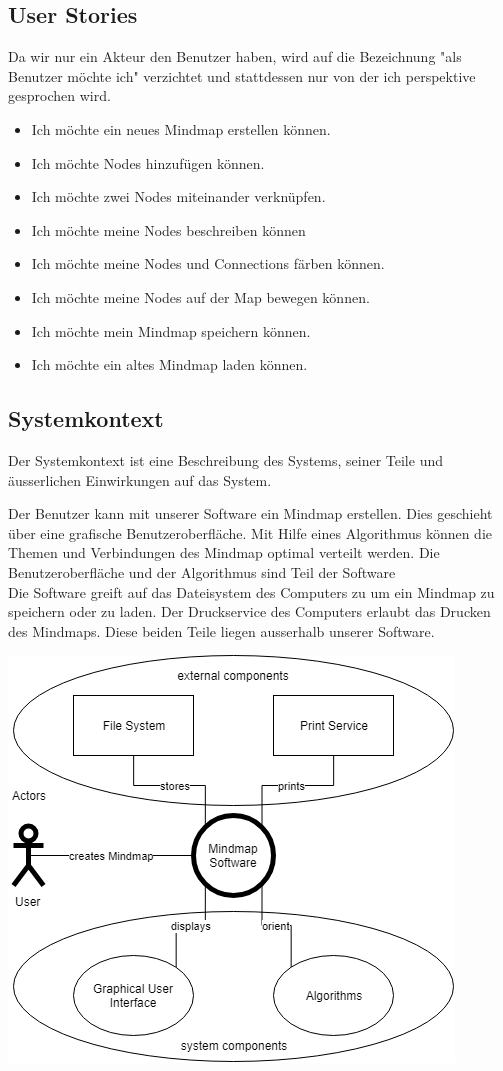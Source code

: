 \documentclass[a4paper,parskip]{scrartcl}
\begin{document}
\subsection{User Stories}
Da wir nur ein Akteur den Benutzer haben, wird auf die Bezeichnung "{}als Benutzer möchte ich"{} verzichtet und stattdessen nur von der ich perspektive gesprochen wird. 
\begin{itemize}
\item Ich möchte ein neues Mindmap erstellen können.
\item Ich möchte Nodes hinzufügen können. 
\item Ich möchte zwei Nodes miteinander verknüpfen.
\item Ich möchte meine Nodes beschreiben können
\item Ich möchte meine Nodes und Connections färben können.
\item Ich möchte meine Nodes auf der Map bewegen können. 
\item Ich möchte mein Mindmap speichern können.
\item Ich möchte ein altes Mindmap laden können.
\end{itemize}

\subsection{Systemkontext}
Der Systemkontext ist eine Beschreibung des Systems, seiner Teile und äusserlichen Einwirkungen auf das System.

Der Benutzer kann mit unserer Software ein Mindmap erstellen. Dies geschieht über eine grafische Benutzeroberfläche. Mit Hilfe eines Algorithmus können die Themen und Verbindungen des Mindmap optimal verteilt werden. Die Benutzeroberfläche und der Algorithmus sind Teil der Software\\
Die Software greift auf das Dateisystem des Computers zu um ein Mindmap zu speichern oder zu laden. Der Druckservice des Computers erlaubt das Drucken des Mindmaps. Diese beiden Teile liegen ausserhalb unserer Software.

\includegraphics[width=0.5\linewidth]{Systemkontext.png}
\end{document}
